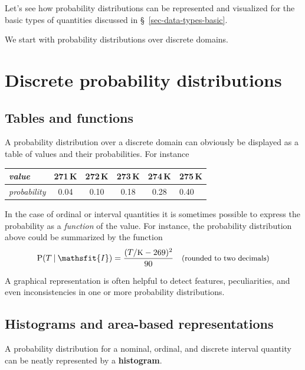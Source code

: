 \documentclass[
  a4paper,
  DIV=11,
  numbers=noendperiod,
  oneside]{scrreprt}
\begin{document}
Let's see how probability distributions can be represented and
visualized for the basic types of quantities discussed in
§~\ref{sec-data-types-basic}.

We start with probability distributions over discrete domains.

\hypertarget{discrete-probability-distributions}{%
\section{Discrete probability
distributions}\label{discrete-probability-distributions}}

\hypertarget{tables-and-functions}{%
\subsection{Tables and functions}\label{tables-and-functions}}

A probability distribution over a discrete domain can obviously be
displayed as a table of values and their probabilities. For instance

\begin{longtable}[]{@{}lccccl@{}}
\toprule\noalign{}
\emph{value} & 271\,K & 272\,K & 273\,K & 274\,K & 275\,K \\
\midrule\noalign{}
\endhead
\bottomrule\noalign{}
\endlastfoot
\emph{probability} & 0.04 & 0.10 & 0.18 & 0.28 & 0.40 \\
\end{longtable}

In the case of ordinal or interval quantities it is sometimes possible
to express the probability as a \emph{function} of the value. For
instance, the probability distribution above could be summarized by the
function \[
\mathrm{P}(T \nonscript\:\vert\nonscript\:\mathopen{} \mathsfit{I}) = 
\frac{(T/\textrm{\small K} - 269)^2}{90}
\quad\text{\small (rounded to two decimals)}
\]

\hfill\break

A graphical representation is often helpful to detect features,
peculiarities, and even inconsistencies in one or more probability
distributions.

\hypertarget{histograms-and-area-based-representations}{%
\subsection{Histograms and area-based
representations}\label{histograms-and-area-based-representations}}

A probability distribution for a nominal, ordinal, and discrete interval
quantity can be neatly represented by a {\textbf{histogram}}.
\end{document}
